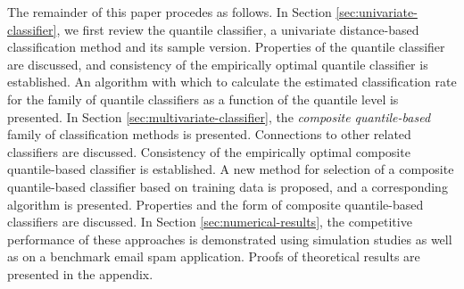 The remainder of this paper procedes as follows.  In Section
\ref{sec:univariate-classifier}, we first review the quantile classifier, a
univariate distance-based classification method and its sample version.
Properties of the quantile classifier are discussed, and consistency of the
empirically optimal quantile classifier is established.  An algorithm with which
to calculate the estimated classification rate for the family of quantile
classifiers as a function of the quantile level is presented.  In Section
\ref{sec:multivariate-classifier}, the \emph{composite quantile-based} family of
classification methods is presented.  Connections to other related classifiers
are discussed.  Consistency of the empirically optimal composite quantile-based
classifier is established.  A new method for selection of a composite
quantile-based classifier based on training data is proposed, and a
corresponding algorithm is presented.  Properties and the form of composite
quantile-based classifiers are discussed.  In Section
\ref{sec:numerical-results}, the competitive performance of these approaches is
demonstrated using simulation studies as well as on a benchmark email spam
application.  Proofs of theoretical results are presented in the appendix.





